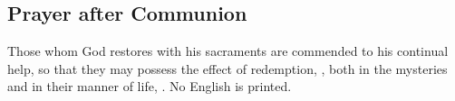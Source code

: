 \subsection{Prayer after Communion}
\label{proper-prayer-after-communion}


\noindent Those whom God restores with his sacraments are commended to his
continual help, so that they may possess the effect of redemption,
, both in the mysteries and in their manner of
life, . No English is printed.
